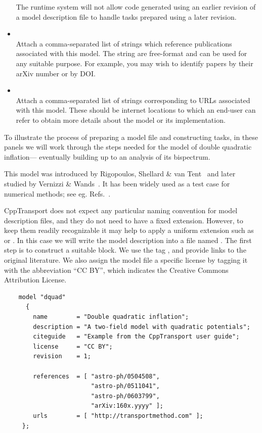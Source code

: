 \documentclass[11pt,a4paper]{article}
\renewcommand{\texttt}[1]{{\ttfamily\fontseries{l}\selectfont{#1}}}
\newenvironment{example}{\begin{tcolorbox}[enhanced,breakable,colback=black!10,colbacktitle=black!20,colframe=black!40,coltitle=black,title=Example,fonttitle=\sffamily\fontseries{b}\selectfont]}{\end{tcolorbox}}
\newcommand{\packagefont}{\sffamily}
\newcommand{\CppTransport}{{\packagefont CppTransport}}
\newcommand{\file}[1]{\texttt{{#1}}}
\newcommand{\block}[1]{\texttt{#1}}
\newcommand{\attribute}[1]{\texttt{#1}}
\begin{document}
\begin{itemize}
    The runtime system will not allow code generated using
    an earlier revision of a model description file to
    handle tasks prepared using a later revision.
    
    \item \attribute{references = [ string, string, ... ];} \\
    Attach a comma-separated list of strings
    which reference publications associated with this model.
    The string are free-format and can be used for any suitable
    purpose. For example, you may wish to identify papers by their
    arXiv number or by DOI.
    
    \item \attribute{urls = [ string, string, ... ];} \\
    Attach a comma-separated list of strings
    corresponding to URLs associated with this model.
    These should be internet locations to which an end-user
    can refer to obtain more details about the model or
    its implementation.
\end{itemize}

\begin{example}
    To illustrate the process of preparing a model file and
    constructing tasks,
    in these panels we will work through the steps needed
    for the model of double quadratic inflation---%
    eventually building up to an analysis of its
    bispectrum.

    This model was introduced by Rigopoulos, Shellard \& van
    Tent~\cite{Rigopoulos:2005xx,Rigopoulos:2005us}
    and later studied by
    Vernizzi \& Wands~\cite{Vernizzi:2006ve}.
    It has been widely used as a test case for numerical methods;
    see eg. Refs.~\cite{Mulryne:2009kh,Mulryne:2010rp}.
    
    {\CppTransport} does not expect any particular naming convention
    for model description files, and they do not need to have a fixed
    extension.
    However, to keep them readily recognizable it may help to
    apply a uniform extension such as \file{.model} or
    \file{.mdl}.
    In this case we will write the model description into a file
    named \file{dquad.model}.
    The first step is to construct a suitable \block{model} block.
	We use the tag \attribute{"dquad"},
	and provide links to the original literature.
	We also assign the model file
	a specific license by tagging it with the abbreviation
	``CC BY'', which indicates the Creative Commons
	Attribution License.
    
    \begin{verbatim}
    model "dquad"
      {
        name        = "Double quadratic inflation";
        description = "A two-field model with quadratic potentials";
        citeguide   = "Example from the CppTransport user guide";
        license     = "CC BY";
        revision    = 1;
    
        references  = [ "astro-ph/0504508",
                        "astro-ph/0511041",
                        "astro-ph/0603799",
                        "arXiv:160x.yyyy" ];
        urls        = [ "http://transportmethod.com" ];
     };    
    \end{verbatim}
\end{example}    
\end{document}
